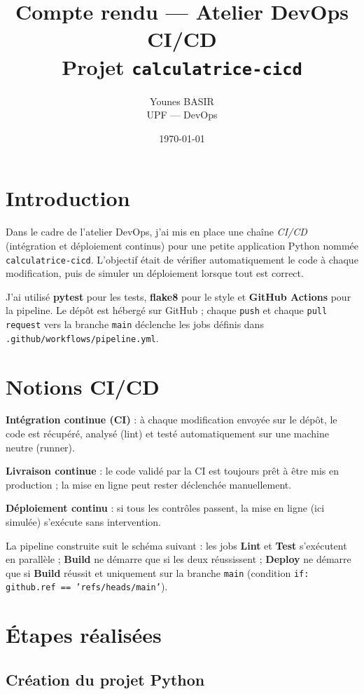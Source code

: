 \documentclass[11pt,a4paper]{article}
\title{Compte rendu --- Atelier DevOps CI/CD\\Projet \texttt{calculatrice-cicd}}
\author{Younes BASIR \\ UPF --- DevOps}
\date{\today}
\begin{document}
\maketitle

\section{Introduction}

Dans le cadre de l'atelier DevOps, j'ai mis en place une chaîne \emph{CI/CD} (intégration et déploiement continus) pour une petite application Python nommée \texttt{calculatrice-cicd}. L'objectif était de vérifier automatiquement le code à chaque modification, puis de simuler un déploiement lorsque tout est correct.

J'ai utilisé \textbf{pytest} pour les tests, \textbf{flake8} pour le style et \textbf{GitHub Actions} pour la pipeline. Le dépôt est hébergé sur GitHub ; chaque \texttt{push} et chaque \texttt{pull request} vers la branche \texttt{main} déclenche les jobs définis dans \texttt{.github/workflows/pipeline.yml}.

\section{Notions CI/CD}

\textbf{Intégration continue (CI)} : à chaque modification envoyée sur le dépôt, le code est récupéré, analysé (lint) et testé automatiquement sur une machine neutre (runner).

\textbf{Livraison continue} : le code validé par la CI est toujours prêt à être mis en production ; la mise en ligne peut rester déclenchée manuellement.

\textbf{Déploiement continu} : si tous les contrôles passent, la mise en ligne (ici simulée) s'exécute sans intervention.

La pipeline construite suit le schéma suivant : les jobs \textbf{Lint} et \textbf{Test} s'exécutent en parallèle ; \textbf{Build} ne démarre que si les deux réussissent ; \textbf{Deploy} ne démarre que si \textbf{Build} réussit et uniquement sur la branche \texttt{main} (condition \texttt{if: github.ref == 'refs/heads/main'}).

\section{Étapes réalisées}

\subsection{Création du projet Python}
\end{document}
